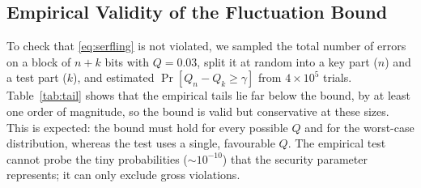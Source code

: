 \subsection{Empirical Validity of the Fluctuation Bound}
To check that \eqref{eq:serfling} is not violated, we sampled the total number of errors on a block of $n+k$ bits with $Q=0.03$, split it at random into a key part ($n$) and a test part ($k$), and estimated $\Pr[Q_n-Q_k\ge\gamma]$ from $4\times10^5$ trials. Table~\ref{tab:tail} shows that the empirical tails lie far below the bound, by at least one order of magnitude, so the bound is valid but conservative at these sizes. This is expected: the bound must hold for every possible $Q$ and for the worst-case distribution, whereas the test uses a single, favourable $Q$. The empirical test cannot probe the tiny probabilities ($\sim10^{-10}$) that the security parameter represents; it can only exclude gross violations.



